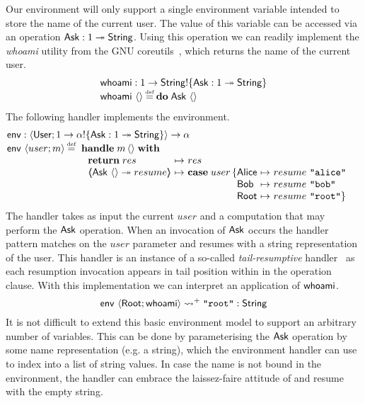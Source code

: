 \documentclass[12pt,phd,lfcs,twoside,openright,logo,leftchapter,normalheadings]{infthesis}
\theoremstyle{plain}
\theoremstyle{definition}
\begin{document}
Our environment will only support a single environment variable
intended to store the name of the current user. The value of this
variable can be accessed via an operation $\mathsf{Ask} : 1 \twoheadrightarrow \mathsf{String}$.
%
%
Using this operation we can readily implement the \emph{whoami}
utility from the GNU coreutils~\cite[Section~20.3]{MacKenzieMPPBYS20},
which returns the name of the current user.
%
\[
  \bl
    \whoami : \UnitType \to \String \eff \{\Ask : \UnitType \opto \String\}\\
    \whoami~\Unit \defas \Do\;\Ask~\Unit
  \el
\]
%
The following handler implements the environment.
%
\[
  \bl
    \environment : \Record{\User;\UnitType \to \alpha \eff \{\Ask : \UnitType \opto \String\}} \to \alpha\\
    \environment~\Record{user;m} \defas
       \ba[t]{@{~}l}
         \Handle\;m\,\Unit\;\With\\
           ~\ba{@{~}l@{~}c@{~}l}
              \Return\;res &\mapsto& res\\
              \OpCase{\Ask}{\Unit}{resume} &\mapsto&
                \bl
                  \Case\;user\,\{
                  \ba[t]{@{}l@{~}c@{~}l}
                    \Alice &\mapsto& resume~\strlit{alice}\\
                    \Bob   &\mapsto& resume~\strlit{bob}\\
                    \Root  &\mapsto& resume~\strlit{root}\}
                   \ea
                \el
           \ea
       \ea
  \el
\]
%
The handler takes as input the current $user$ and a computation that
may perform the $\mathsf{Ask}$ operation. When an invocation of $\mathsf{Ask}$ occurs
the handler pattern matches on the $user$ parameter and resumes with a
string representation of the user. This handler is an instance of a
so-called \emph{tail-resumptive} handler~\cite{Leijen17b,XieBHSL20} as
each resumption invocation appears in tail position within in the
operation clause.
%
With this implementation we can interpret an application of $\mathsf{whoami}$.
%
\[
  \mathsf{env}~\langle \mathsf{Root};\mathsf{whoami} \rangle \leadsto^+ \texttt{"root"} : \mathsf{String}
\]
%
It is not difficult to extend this basic environment model to support
an arbitrary number of variables. This can be done by parameterising
the $\mathsf{Ask}$ operation by some name representation (e.g. a string),
which the environment handler can use to index into a list of string
values. In case the name is not bound in the environment, the handler
can embrace the laissez-faire attitude of \UNIX{} and resume with the
empty string.
\end{document}
